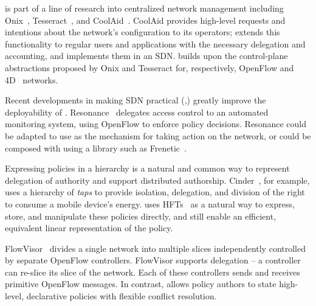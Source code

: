 %
\sys is part of a line of research into centralized network management including
Onix~\cite{Koponen:2010}, Tesseract~\cite{Tesseract}, and CoolAid~\cite{CoolAid}.
CoolAid provides high-level requests and intentions about the network's configuration
to its operators; \sys extends this functionality to regular users and applications with
the necessary delegation and accounting, and implements them in an SDN.
\sys builds upon the control-plane abstractions proposed by Onix and Tesseract 
for, respectively, OpenFlow and 4D~\cite{Greenberg:2005} networks.

Recent developments in making SDN practical
(\eg,\cite{Gude:2008,McKeown:2008, Voellmy:2011}) greatly improve
the deployability of \sys.  
Resonance~\cite{Nayak:2009} delegates access control to an automated
monitoring system, using OpenFlow to enforce policy decisions.
Resonance could be adapted to use \sys as the mechanism for taking
action on the network, or could be composed with \sys using a
library such as Frenetic~\cite{Foster:2010}.

Expressing policies in a hierarchy is a natural and common way to represent
delegation of authority and support distributed authorship. Cinder~\cite{Roy:2011}, for example, uses a hierarchy of \emph{taps} to provide isolation, delegation, and division of the right to consume
a mobile device's energy.
\sys uses HFTs~\cite{Ferguson:2012b} as a natural way to express, store, and
manipulate these policies
directly, and still enable an efficient, equivalent linear representation of the policy.

FlowVisor~\cite{Sherwood:2010} divides a single network into multiple slices
independently controlled by separate OpenFlow controllers. FlowVisor
supports delegation -- a controller can re-slice its slice of the
network. Each of these controllers sends and receives primitive
OpenFlow messages. In contrast, \sys allows policy authors to
state high-level, declarative policies with flexible conflict resolution.





